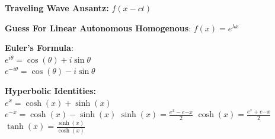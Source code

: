 \documentclass[12pt]{article}
\begin{document}
\textbf{Traveling Wave Ansantz:} $f(x-ct)$

\textbf{Guess For Linear Autonomous Homogenous}: $f(x) = e^{\lambda x}$

\textbf{Euler's Formula}:\\
$e^{i \theta} = \cos(\theta) + i \sin{\theta}$\\
$e^{-i \theta} = \cos(\theta) - i \sin{\theta}$

\textbf{Hyperbolic Identities:}\\
$e^{x} = \cosh(x) + \sinh(x)$\\
$e^{-x} = \cosh(x) - \sinh(x)$
$\sinh(x)  = \frac{e^x - e{-x}}{2}$
$\cosh(x)  = \frac{e^x + e{-x}}{2}$
$\tanh(x) = \frac{\sinh(x)}{\cosh(x) } $
\end{document}
